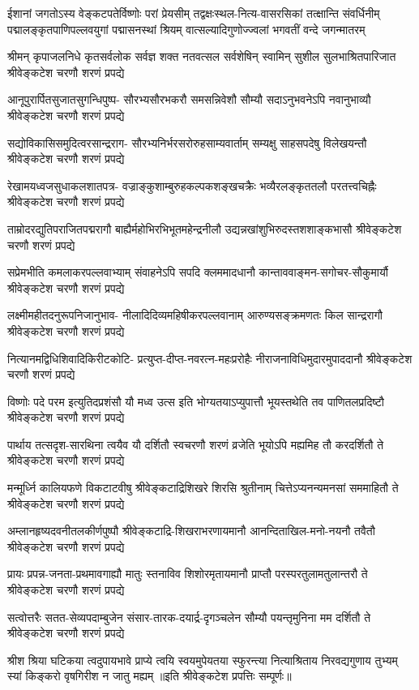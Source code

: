 
\fourlineindentedshloka
{ईशानां जगतोऽस्य वेङ्कटपतेर्विष्णोः परां प्रेयसीम्}
{तद्वक्षःस्थल-नित्य-वासरसिकां तत्क्षान्ति संवर्धिनीम्}
{पद्मालङ्कृतपाणिपल्लवयुगां पद्मासनस्थां श्रियम्}
{वात्सल्यादिगुणोज्ज्वलां भगवतीं वन्दे जगन्मातरम्}

\fourlineindentedshloka
{श्रीमन् कृपाजलनिधे कृतसर्वलोक}
{सर्वज्ञ शक्त नतवत्सल सर्वशेषिन्}
{स्वामिन् सुशील सुलभाश्रितपारिजात}
{श्रीवेङ्कटेश चरणौ शरणं प्रपद्ये}

\fourlineindentedshloka
{आनूपुरार्पितसुजातसुगन्धिपुष्प-}
{सौरभ्यसौरभकरौ समसन्निवेशौ}
{सौम्यौ सदाऽनुभवनेऽपि नवानुभाव्यौ}
{श्रीवेङ्कटेश चरणौ शरणं प्रपद्ये}

\fourlineindentedshloka
{सद्योविकासिसमुदित्वरसान्द्रराग-}
{सौरभ्यनिर्भरसरोरुहसाम्यवार्ताम्}
{सम्यक्षु साहसपदेषु विलेखयन्तौ}
{श्रीवेङ्कटेश चरणौ शरणं प्रपद्ये}

\fourlineindentedshloka
{रेखामयध्वजसुधाकलशातपत्र-}
{वज्राङ्कुशाम्बुरुहकल्पकशङ्खचक्रैः}
{भव्यैरलङ्कृततलौ परतत्त्वचिह्नैः}
{श्रीवेङ्कटेश चरणौ शरणं प्रपद्ये}

\fourlineindentedshloka
{ताम्रोदरद्युतिपराजितपद्मरागौ}
{बाह्यैर्महोभिरभिभूतमहेन्द्रनीलौ}
{उद्यन्नखांशुभिरुदस्तशशाङ्कभासौ}
{श्रीवेङ्कटेश चरणौ शरणं प्रपद्ये}

\fourlineindentedshloka
{सप्रेमभीति कमलाकरपल्लवाभ्याम्}
{संवाहनेऽपि सपदि क्लममादधानौ}
{कान्ताववाङ्मन-सगोचर-सौकुमार्यौ}
{श्रीवेङ्कटेश चरणौ शरणं प्रपद्ये}

\fourlineindentedshloka
{लक्ष्मीमहीतदनुरूपनिजानुभाव-}
{नीलादिदिव्यमहिषीकरपल्लवानाम्}
{आरुण्यसङ्क्रमणतः किल सान्द्ररागौ}
{श्रीवेङ्कटेश चरणौ शरणं प्रपद्ये}

\fourlineindentedshloka
{नित्यानमद्विधिशिवादिकिरीटकोटि-}
{प्रत्युप्त-दीप्त-नवरत्न-महःप्ररोहैः}
{नीराजनाविधिमुदारमुपाददानौ}
{श्रीवेङ्कटेश चरणौ शरणं प्रपद्ये}

\fourlineindentedshloka
{विष्णोः पदे परम इत्युतिदप्रशंसौ}
{यौ मध्व उत्स इति भोग्यतयाऽप्युपात्तौ}
{भूयस्तथेति तव पाणितलप्रदिष्टौ}
{श्रीवेङ्कटेश चरणौ शरणं प्रपद्ये}

\fourlineindentedshloka
{पार्थाय तत्सदृश-सारथिना त्वयैव}
{यौ दर्शितौ स्वचरणौ शरणं व्रजेति}
{भूयोऽपि मह्यमिह तौ करदर्शितौ ते}
{श्रीवेङ्कटेश चरणौ शरणं प्रपद्ये}

\fourlineindentedshloka
{मन्मूर्ध्नि कालियफणे विकटाटवीषु}
{श्रीवेङ्कटाद्रिशिखरे शिरसि श्रुतीनाम्}
{चित्तेऽप्यनन्यमनसां सममाहितौ ते}
{श्रीवेङ्कटेश चरणौ शरणं प्रपद्ये}

\fourlineindentedshloka
{अम्लानहृष्यदवनीतलकीर्णपुष्पौ}
{श्रीवेङ्कटाद्रि-शिखराभरणायमानौ}
{आनन्दिताखिल-मनो-नयनौ तवैतौ}
{श्रीवेङ्कटेश चरणौ शरणं प्रपद्ये}

\fourlineindentedshloka
{प्रायः प्रपन्न-जनता-प्रथमावगाह्यौ}
{मातुः स्तनाविव शिशोरमृतायमानौ}
{प्राप्तौ परस्परतुलामतुलान्तरौ ते}
{श्रीवेङ्कटेश चरणौ शरणं प्रपद्ये}

\fourlineindentedshloka
{सत्वोत्तरैः सतत-सेव्यपदाम्बुजेन}
{संसार-तारक-दयार्द्र-दृगञ्चलेन}
{सौम्यौ पयन्तृमुनिना मम दर्शितौ ते}
{श्रीवेङ्कटेश चरणौ शरणं प्रपद्ये}

\fourlineindentedshloka
{श्रीश श्रिया घटिकया त्वदुपायभावे}
{प्राप्ये त्वयि स्वयमुपेयतया स्फुरन्त्या}
{नित्याश्रिताय निरवद्यगुणाय तुभ्यम्}
{स्यां किङ्करो वृषगिरीश न जातु मह्यम्}
॥इति श्रीवेङ्कटेश प्रपत्तिः सम्पूर्णः॥